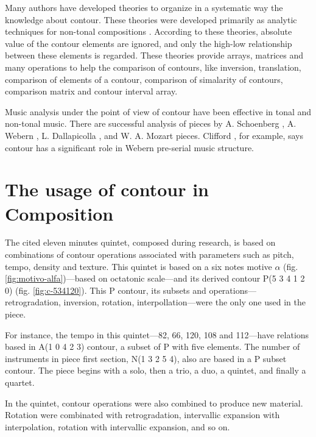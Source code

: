 Many authors
\cite{friedmann85:methodology,friedmann87:response,morris87:composition,morris93:directions,marvin.ea87:relating,marvin88:generalized,marvin.ea95:generalization,polansky.ea92:possible,quinn97:fuzzy,clifford95:contour,beard03:contour}
have developed theories to organize in a systematic way the knowledge
about contour. These theories were developed primarily as analytic
techniques for non-tonal compositions \cite{beard03:contour}.
According to these theories, absolute value of the contour elements
are ignored, and only the high-low relationship between these elements
is regarded. These theories provide arrays, matrices and many
operations to help the comparison of contours, like inversion,
translation, comparison of elements of a contour, comparison of
simalarity of contours, comparison matrix and contour interval array.

Music analysis under the point of view of contour have been effective
in tonal and non-tonal music. There are successful analysis of pieces
by A. Schoenberg \cite{friedmann85:methodology}, A. Webern
\cite{clifford95:contour}, L. Dallapicolla
\cite{marvin88:generalized}, and W. A. Mozart \cite{beard03:contour}
pieces. Clifford \cite{clifford95:contour}, for example, says contour
has a significant role in Webern pre-serial music structure.

\section{The usage of contour in Composition}
\label{sec:contour-composition}

The cited eleven minutes quintet, composed during research, is based
on combinations of contour operations associated with parameters such
as pitch, tempo, density and texture. This quintet is based on a six
notes motive $\alpha$ (fig. \ref{fig:motivo-alfa})---based on
octatonic scale---and its derived contour P(5 3 4 1 2 0)
(fig. \ref{fig:c-534120}). This P contour, its subsets and
operations---retrogradation, inversion, rotation,
interpollation---were the only one used in the piece.

For instance, the tempo in this quintet---82, 66, 120, 108 and
112---have relations based in A(1 0 4 2 3) contour, a subset of P with
five elements. The number of instruments in piece first section, N(1 3
2 5 4), also are based in a P subset contour. The piece begins with a
solo, then a trio, a duo, a quintet, and finally a quartet.

In the quintet, contour operations were also combined to produce new
material. Rotation were combinated with retrogradation, intervallic
expansion with interpolation, rotation with intervallic expansion, and
so on.

